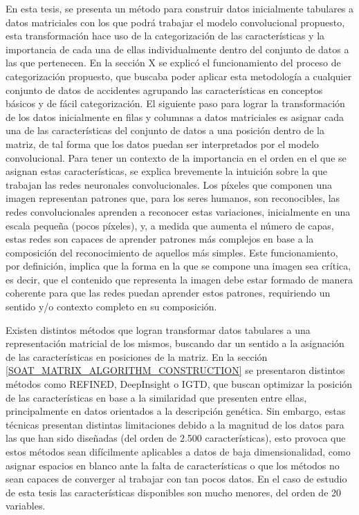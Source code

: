 \documentclass{uathesis-es}
\begin{document}
En esta tesis, se presenta un método para construir datos inicialmente tabulares a datos matriciales con los que podrá trabajar el modelo convolucional propuesto, esta transformación hace uso de la categorización de las características y la importancia de cada una de ellas individualmente dentro del conjunto de datos a las que pertenecen. En la sección X se explicó el funcionamiento del proceso de categorización propuesto, que buscaba poder aplicar esta metodología a cualquier conjunto de datos de accidentes agrupando las características en conceptos básicos y de fácil categorización. El siguiente paso para lograr la transformación de los datos inicialmente en filas y columnas a datos matriciales es asignar cada una de las características del conjunto de datos a una posición dentro de la matriz, de tal forma que los datos puedan ser interpretados por el modelo convolucional. Para tener un contexto de la importancia en el orden en el que se asignan estas características, se explica brevemente la intuición sobre la que trabajan las redes neuronales convolucionales. Los píxeles que componen una imagen representan patrones que, para los seres humanos, son reconocibles, las redes convolucionales aprenden a reconocer estas variaciones, inicialmente en una escala pequeña (pocos píxeles), y, a medida que aumenta el número de capas, estas redes son capaces de aprender patrones más complejos en base a la composición del reconocimiento de aquellos más simples. Este funcionamiento, por definición, implica que la forma en la que se compone una imagen sea crítica, es decir, que el contenido que representa la imagen debe estar formado de manera coherente para que las redes puedan aprender estos patrones, requiriendo un sentido y/o contexto completo en su composición.

Existen distintos métodos que logran transformar datos tabulares a una representación matricial de los mismos, buscando dar un sentido a la asignación de las características en posiciones de la matriz. En la sección \ref{SOAT_MATRIX_ALGORITHM_CONSTRUCTION} se presentaron distintos métodos como REFINED, DeepInsight o IGTD, que buscan optimizar la posición de las características en base a la similaridad que presenten entre ellas, principalmente en datos orientados a la descripción genética. Sin embargo, estas técnicas presentan distintas limitaciones debido a la magnitud de los datos para las que han sido diseñadas (del orden de 2.500 características), esto provoca que estos métodos sean difícilmente aplicables a datos de baja dimensionalidad, como asignar espacios en blanco ante la falta de características o que los métodos no sean capaces de converger al trabajar con tan pocos datos. En el caso de estudio de esta tesis las características disponibles son mucho menores, del orden de 20 variables.
\end{document}
